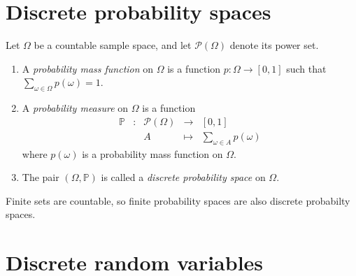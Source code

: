 \documentclass[lecture]{csm}
\newcommand{\prob}{\mathbb{P}}
\def\it{\item}
\def\ben{\begin{enumerate}}
\def\een{\end{enumerate}}
\begin{document}
\maketitle
\tableofcontents


\section{Discrete probability spaces}

\begin{definition}
Let $\Omega$ be a countable sample space, and let $\mathcal{P}(\Omega)$ denote its power set.
\ben
\it %
A \emph{probability mass function} on $\Omega$ is a function $p:\Omega\to[0,1]$
such that $\displaystyle\sum_{\omega\in\Omega} p(\omega) = 1$.
\it %
A \emph{probability measure} on $\Omega$ is a function 
\[
\begin{array}{ccccl}
\prob 	& :	& \mathcal{P}(\Omega)	& \to 		& [0,1] \\[1ex]
		&	& A						& \mapsto	& \displaystyle\sum_{\omega\in A} p(\omega)
\end{array}
\]
where $p(\omega)$ is a probability mass function on $\Omega$.
\it %
The pair $(\Omega,\prob)$ is called a \emph{discrete probability space} on $\Omega$.
\een
\end{definition}

\begin{remark}
Finite sets are countable, so finite probability spaces are also discrete probabilty spaces.
\end{remark}

\newpage
\section{Discrete random variables}
\end{document}
